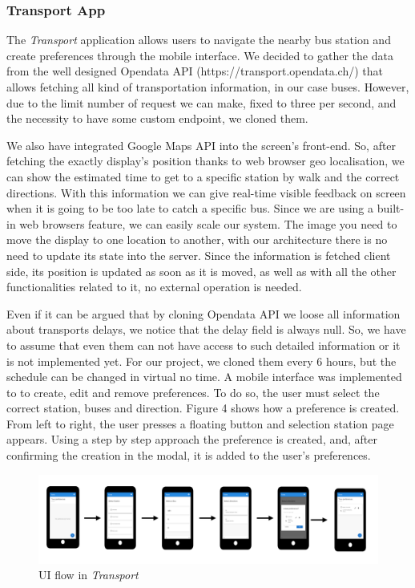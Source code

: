 \documentclass[]{usiinfbachelorproject}
\begin{document}
\subsubsection{Transport App}
The \emph{Transport} application allows users to navigate the nearby bus station and create preferences through the mobile interface. We decided to gather the data from the well designed Opendata API (https://transport.opendata.ch/) that allows fetching all kind of transportation information, in our case buses.
However, due to the limit number of request we can make, fixed to three per second, and the necessity to have some custom endpoint, we cloned them.

We also have integrated Google Maps API into the screen's front-end. So, after fetching the exactly display's position thanks to web browser geo localisation, we can show the estimated time to get to a specific station by walk and the correct directions. With this information we can give real-time visible feedback on screen when it is going to be too late to catch a specific bus. Since we are using a built-in web browsers feature, we can easily scale our system. The image you need to move the display to one location to another, with our architecture there is no need to update its state into the server. Since the information is fetched client side, its position is updated as soon as it is moved, as well as with all the other functionalities related to it,  no external operation is needed.

Even if it can be argued that by cloning Opendata API we loose all information about transports delays, we notice that the delay field is always null. So, we have to assume that even them can not have access to such detailed information or it is not implemented yet. For our project, we cloned them every 6 hours, but the schedule can be changed in virtual no time. A mobile interface was implemented to to create, edit and remove preferences. To do so, the user must select the correct station, buses and direction. Figure 4 shows how a preference is created. From left to right, the user presses a floating button and selection station page appears. Using a step by step approach the preference is created, and, after confirming the creation in the modal, it is added to the user's preferences.  

\begin{figure}[H]
  \centering
  \includegraphics[width=1\textwidth]{./images/UI_flow_transport.png}
   \caption{UI flow in \emph{Transport}}

\end{figure} 
\end{document}
